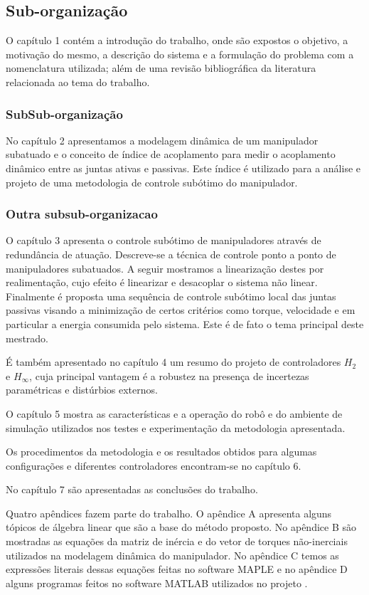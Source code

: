 \subsection{Sub-organização}
O capítulo 1 contém a introdução do trabalho, onde são expostos o objetivo, a motivação do mesmo, a descrição do sistema e a formulação do problema com a nomenclatura utilizada; além de uma revisão bibliográfica da literatura relacionada ao tema do trabalho.

\subsubsection{SubSub-organização}

No capítulo 2 apresentamos a modelagem dinâmica de um manipulador subatuado e o conceito de índice de acoplamento para medir o acoplamento dinâmico entre as juntas ativas e passivas. Este índice é utilizado para a análise e projeto de uma metodologia de controle subótimo do manipulador.

\subsubsection{Outra subsub-organizacao}

O capítulo 3 apresenta o controle subótimo de manipuladores através de redundância de atuação. Descreve-se a técnica de controle ponto a ponto de manipuladores subatuados. A seguir mostramos  a linearização destes por realimentação, cujo efeito é linearizar e desacoplar o sistema não linear. Finalmente é proposta uma sequência de controle subótimo local das juntas passivas visando a minimização de certos critérios como torque, velocidade e em particular a energia consumida pelo sistema. Este é de fato o tema principal deste mestrado.

É também apresentado no capítulo 4 um resumo do projeto de controladores  $H_{2}$ e $H_{\infty}$, cuja principal vantagem é a robustez na presença de incertezas paramétricas e distúrbios externos.

O capítulo 5 mostra as características e a operação do robô e do ambiente de simulação utilizados nos testes e experimentação da metodologia apresentada.

Os procedimentos da metodologia e os resultados obtidos para algumas configurações e diferentes controladores encontram-se no capítulo 6.

No capítulo 7 são apresentadas as conclusões do trabalho.

Quatro apêndices fazem parte do trabalho. O apêndice A apresenta alguns tópicos de álgebra linear que são a base do método proposto. No apêndice B são mostradas as equações da matriz de inércia e do vetor de torques não-inerciais
utilizados na modelagem dinâmica do manipulador. No apêndice C temos as expressões literais dessas equações feitas no software MAPLE e no apêndice D alguns programas feitos no software MATLAB utilizados no projeto \cite{Furmento1995}\cite{Morgado2003}.

